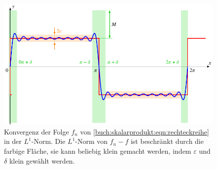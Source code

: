 %
%
%
\begin{figure}
\centering
\includegraphics{chapters/010-skalarprodukt/images/l1konvergenz.pdf}
\caption{Konvergenz der Folge $f_n$ von
\eqref{buch:skalarprodukt:eqn:rechteckreihe} in der $L^1$-Norm.
Die $L^1$-Norm von $f_n-f$ ist beschränkt durch die farbige Fläche,
sie kann beliebig klein gemacht werden, indem $\varepsilon$ und
$\delta$ klein gewählt werden.
\label{buch:skalarprodukt:funktionenraeume:fig:l1konvergenz}}
\end{figure}
